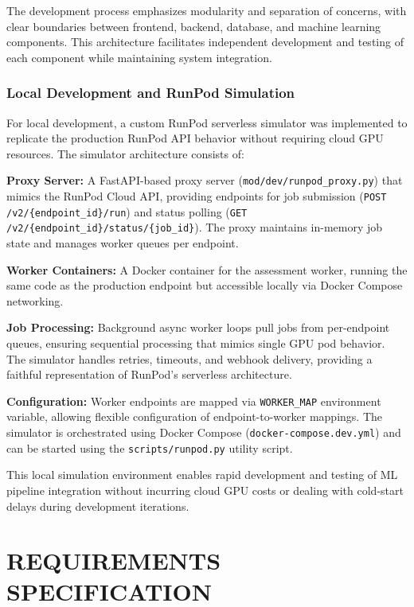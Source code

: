 \documentclass[a4paper,12pt]{report}
\begin{document}
The development process emphasizes modularity and separation of concerns, with clear boundaries between frontend, backend, database, and machine learning components. This architecture facilitates independent development and testing of each component while maintaining system integration.

\subsection{Local Development and RunPod Simulation}

For local development, a custom RunPod serverless simulator was implemented to replicate the production RunPod API behavior without requiring cloud GPU resources. The simulator architecture consists of:

\textbf{Proxy Server:} A FastAPI-based proxy server (\texttt{mod/dev/runpod\_proxy.py}) that mimics the RunPod Cloud API, providing endpoints for job submission (\texttt{POST /v2/\{endpoint\_id\}/run}) and status polling (\texttt{GET /v2/\{endpoint\_id\}/status/\{job\_id\}}). The proxy maintains in-memory job state and manages worker queues per endpoint.

\textbf{Worker Containers:} A Docker container for the assessment worker, running the same code as the production endpoint but accessible locally via Docker Compose networking.

\textbf{Job Processing:} Background async worker loops pull jobs from per-endpoint queues, ensuring sequential processing that mimics single GPU pod behavior. The simulator handles retries, timeouts, and webhook delivery, providing a faithful representation of RunPod's serverless architecture.

\textbf{Configuration:} Worker endpoints are mapped via \texttt{WORKER\_MAP} environment variable, allowing flexible configuration of endpoint-to-worker mappings. The simulator is orchestrated using Docker Compose (\texttt{docker-compose.dev.yml}) and can be started using the \texttt{scripts/runpod.py} utility script.

This local simulation environment enables rapid development and testing of ML pipeline integration without incurring cloud GPU costs or dealing with cold-start delays during development iterations.

\chapter{REQUIREMENTS SPECIFICATION}
\end{document}

